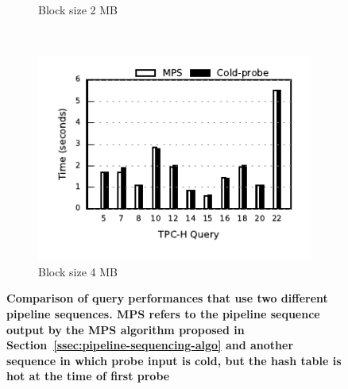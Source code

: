\begin{figure}[ht]
\begin{subfigure}[ht]{0.3\textwidth}
		\caption{Block size 2 MB}
	\end{subfigure}
	~
	\begin{subfigure}[ht]{0.3\textwidth}
		\includegraphics[width=\textwidth]{pipeline/figures/coldprobe-sequence-20threads-tpch-sf50-bs4mb-withlip-colstore}	
		\caption{Block size 4 MB}
	\end{subfigure}
	\caption{\textbf{Comparison of query performances that use two different pipeline sequences. MPS refers to the pipeline sequence output by the MPS algorithm proposed in Section~\ref{ssec:pipeline-sequencing-algo} and another sequence in which probe input is cold, but the hash table is hot at the time of first probe}}
	\label{fig:pipeline-sequence-comparison}
\end{figure}

